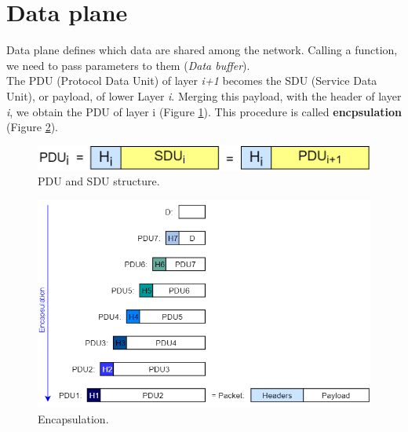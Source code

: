 \section{Data plane}
Data plane defines which data are shared among the network. Calling a function, we need to pass parameters to them (\textit{Data buffer}).\\
The PDU (Protocol Data Unit) of layer \textit{i+1} becomes the SDU (Service Data Unit), or payload, of lower Layer \textit{i}. Merging this payload, with the header of layer \textit{i}, we obtain the PDU of layer i (Figure \ref{pdu_sdu}). This procedure is called \textbf{encpsulation} (Figure \ref{encapsulation}).
\begin{figure}[h]
\centering
\includegraphics[scale=0.25]{Images/OSI/pdu_sdu}
\caption{PDU and SDU structure.}\label{pdu_sdu}
\end{figure}
\begin{figure}[h]
\centering
\includegraphics[scale=0.5]{Images/OSI/encapsulation}
\caption{\footnotesize{Encapsulation.}}\label{encapsulation}
\end{figure}
\vspace{3cm}
